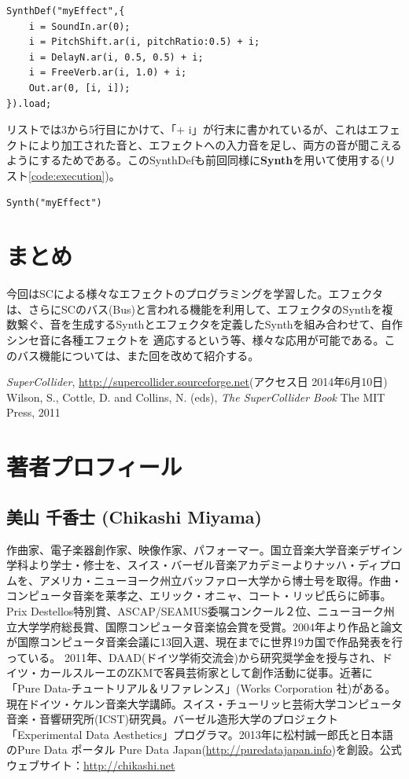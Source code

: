 \documentclass{jsarticle}
\begin{document}
\begin{lstlisting}[caption=エフェクトのSynthDef, label=code:combination]
SynthDef("myEffect",{
	i = SoundIn.ar(0);
	i = PitchShift.ar(i, pitchRatio:0.5) + i;
	i = DelayN.ar(i, 0.5, 0.5) + i;
	i = FreeVerb.ar(i, 1.0) + i;
	Out.ar(0, [i, i]);
}).load;
\end{lstlisting}

リストでは3から5行目にかけて、「+ i」が行末に書かれているが、これはエフェクトにより加工された音と、エフェクトへの入力音を足し、両方の音が聞こえるようにするためである。このSynthDefも前回同様に{\bf Synth}を用いて使用する(リスト\ref{code:execution})。

\begin{lstlisting}[caption=エフェクトSynthDefの使用, label=code:execution]
Synth("myEffect")
\end{lstlisting}

\section{まとめ}
今回はSCによる様々なエフェクトのプログラミングを学習した。エフェクタは、さらにSCのバス(Bus)と言われる機能を利用して、エフェクタのSynthを複数繋ぐ、音を生成するSynthとエフェクタを定義したSynthを組み合わせて、自作シンセ音に各種エフェクトを
適応するという等、様々な応用が可能である。このバス機能については、また回を改めて紹介する。


\begin{thebibliography}{citations}
   {\it SuperCollider}, \url{http://supercollider.sourceforge.net}(アクセス日 2014年6月10日)
   Wilson, S., Cottle, D. and Collins, N. (eds), {\it The SuperCollider Book} The MIT Press, 2011

\end{thebibliography}

\section{著者プロフィール}
\subsection{美山 千香士 (Chikashi Miyama)}
作曲家、電子楽器創作家、映像作家、パフォーマー。国立音楽大学音楽デザイン学科より学士・修士を、スイス・バーゼル音楽アカデミーよりナッハ・ディプロムを、アメリカ・ニューヨーク州立バッファロー大学から博士号を取得。作曲・コンピュータ音楽を莱孝之、エリック・オニャ、コート・リッピ氏らに師事。Prix Destellos特別賞、ASCAP/SEAMUS委嘱コンクール２位、ニューヨーク州立大学学府総長賞、国際コンピュータ音楽協会賞を受賞。2004年より作品と論文が国際コンピュータ音楽会議に13回入選、現在までに世界19カ国で作品発表を行っている。 2011年、DAAD(ドイツ学術交流会)から研究奨学金を授与され、ドイツ・カールスルーエのZKMで客員芸術家として創作活動に従事。近著に「Pure Data-チュートリアル＆リファレンス」(Works Corporation 社)がある。現在ドイツ・ケルン音楽大学講師。スイス・チューリッヒ芸術大学コンピュータ音楽・音響研究所(ICST)研究員。バーゼル造形大学のプロジェクト「Experimental Data Aesthetics」プログラマ。2013年に松村誠一郎氏と日本語のPure Data ポータル Pure Data Japan(\url{http://puredatajapan.info})を創設。公式ウェブサイト：\url{http://chikashi.net}
\end{document}
